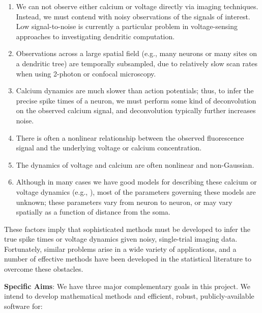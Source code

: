 \documentclass[12pt]{article}
\begin{document}
\begin{enumerate}
  
\item We can not observe either calcium or voltage directly via
  imaging techniques.  Instead, we must contend with noisy
  observations of the signals of interest.  Low signal-to-noise is
  currently a particular problem in voltage-sensing approaches to
  investigating dendritic computation.

\item Observations across a large spatial field (e.g., many neurons or
  many sites on a dendritic tree) are temporally subsampled, due to
  relatively slow scan rates when using 2-photon or confocal
  microscopy.

\item Calcium dynamics are much slower than action potentials; thus,
  to infer the precise spike times of a neuron, we must perform some
  kind of deconvolution on the observed calcium signal, and
  deconvolution typically further increases noise.

\item There is often a nonlinear relationship between the observed
  fluorescence signal and the underlying voltage or calcium
  concentration.

\item The dynamics of voltage and calcium are often nonlinear and
non-Gaussian.

\item Although in many cases we have good models for describing these
  calcium or voltage dynamics (e.g., \cite{TankDelaney95}), most of
  the parameters governing these models are unknown; these parameters
  vary from neuron to neuron, or may vary spatially as a function of
  distance from the soma.

\end{enumerate}

These factors imply that sophisticated methods must be developed to
infer the true spike times or voltage dynamics given noisy,
single-trial imaging data.  Fortunately, similar problems arise in a
wide variety of applications, and a number of effective methods have
been developed in the statistical literature to overcome these
obstacles.  

\clearpage

\noindent \textbf{Specific Aims}: We have three major complementary
goals in this project.  We intend to develop mathematical methods and
efficient, robust, publicly-available software for:
\end{document}
